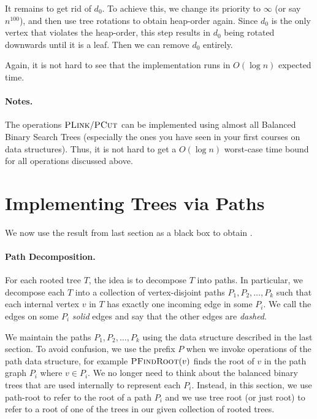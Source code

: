 It remains to get rid of $d_0$. To achieve this, we change its priority to $\infty$ (or say $n^{100}$), and then use tree rotations to obtain heap-order again. Since $d_0$ is the only vertex that violates the heap-order, this step results in $d_0$ being rotated downwards until it is a leaf. Then we can remove $d_0$ entirely. 

Again, it is not hard to see that the implementation runs in $O(\log n)$ expected time.

\paragraph{Notes.} The operations $\textsc{PLink}/ \textsc{PCut}$ can be implemented using almost all Balanced Binary Search Trees (especially the ones you have seen in your first courses on data structures). Thus, it is not hard to get a $O(\log n)$ worst-case time bound for all operations discussed above.

\section{Implementing Trees via Paths}

We now use the result from last section as a black box to obtain .

\paragraph{Path Decomposition.} For each rooted tree $T$, the idea is to decompose $T$ into paths. In particular, we decompose each $T$ into a collection of vertex-disjoint paths $P_1, P_2, \dots, P_k$ such that each internal vertex $v$ in $T$ has exactly one incoming edge in some $P_i$. We call the edges on some $P_i$  \emph{solid} edges and say that the other edges are \emph{dashed}. 

We maintain the paths $P_1, P_2, \dots, P_k$ using the data structure described in the last section. To avoid confusion, we use the prefix $P$ when we invoke operations of the path data structure, for example $\textsc{PFindRoot}(v)$ finds the root of $v$ in the path graph $P_i$ where $v \in P_i$.
We no longer need to think about the balanced binary trees that are used internally to represent each $P_i$. Instead, in this section, we use path-root to refer to the root of a path $P_i$ and we use tree root (or just root) to refer to a root of one of the trees in our given collection of rooted trees.

